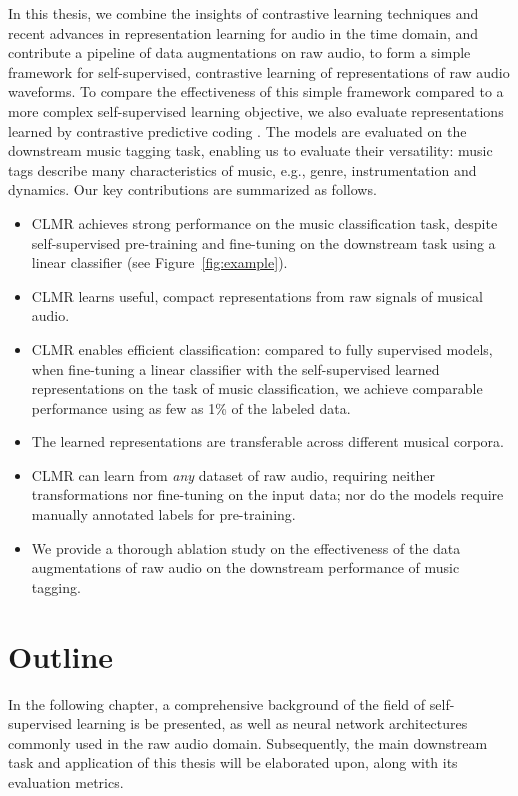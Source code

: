 In this thesis, we combine the insights of contrastive learning techniques and recent advances in representation learning for audio in the time domain, and contribute a pipeline of data augmentations on raw audio, to form a simple framework for self-supervised, contrastive learning of representations of raw audio waveforms.
To compare the effectiveness of this simple framework compared to a more complex self-supervised learning objective, we also evaluate representations learned by contrastive predictive coding \cite{oord_representation_2019}.
The models are evaluated on the downstream music tagging task, enabling us to evaluate their versatility: music tags describe many characteristics of music, e.g., genre, instrumentation and dynamics.
Our key contributions are summarized as follows.
\begin{itemize}
    \item CLMR achieves strong performance on the music classification task, despite self-supervised pre-training and fine-tuning on the downstream task using a linear classifier (see Figure~\ref{fig:example}).
    \item CLMR learns useful, compact representations from raw signals of musical audio.
    \item CLMR enables efficient classification: compared to fully supervised models, when fine-tuning a linear classifier with the self-supervised learned representations on the task of music classification, we achieve comparable performance using as few as 1\% of the labeled data.
    \item The learned representations are transferable across different musical corpora.
    \item CLMR can learn from \emph{any} dataset of raw audio, requiring neither transformations nor fine-tuning on the input data; nor do the models require manually annotated labels for pre-training.
    \item We provide a thorough ablation study on the effectiveness of the data augmentations of raw audio on the downstream performance of music tagging.
\end{itemize}


\section{Outline}
In the following chapter, a comprehensive background of the field of self-supervised learning is be presented, as well as neural network architectures commonly used in the raw audio domain.
Subsequently, the main downstream task and application of this thesis will be elaborated upon, along with its evaluation metrics.

